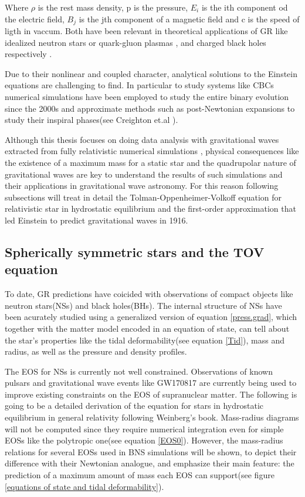 Where $\rho$ is the rest mass density, p is the pressure, $E_i$ is the ith component od the electric field, $B_j$ is the jth component of a magnetic field and c is the speed of ligth in vaccum. Both have been relevant in theoretical applications of GR like idealized neutron stars or quark-gluon plasmas \cite{Nagle_2011}, and charged black holes respectively \cite{PhysRevD.13.2713}.

Due to their nonlinear and coupled character, analytical solutions to the Einstein equations are challenging to find. In particular to study systems like CBCs numerical simulations have been employed to study the entire binary evolution since the 2000s \cite{Shibata:1999hn,Shibata:1999wm,Shibata:2019wef} and  approximate methods such as post-Newtonian expansions to study their inspiral phases(see Creighton et.al \cite[chapter X]{Creighton:2011zz}). 

Although this thesis focuses on doing data analysis with gravitational waves extracted from fully relativistic numerical simulations \cite{Bishop:2016lgv}, physical consequences like the existence of a maximum mass for a static star and the quadrupolar nature of gravitational waves are key to understand the results of such simulations and their applications in gravitational wave astronomy. For this reason following subsections will treat in detail the Tolman-Oppenheimer-Volkoff equation for relativistic star in hydrostatic equilibrium and  the first-order approximation that led Einstein to predict gravitational waves in 1916.



\subsection{Spherically symmetric stars and the TOV equation}\label{codeon}

To date, GR predictions have coicided with observations of compact objects like neutron stars(NSs) and black holes(BHs). The internal structure of NSs have been acurately studied using a generalized version of equation \ref{press.grad}, which together with the matter model encoded in an equation of state, can tell about the star's properties like the tidal deformability(see equation \ref{Tid}), mass and radius, as well as the pressure and density profiles. 

The EOS for NSs is currently not well constrained. Observations of known pulsars and gravitational wave events like GW170817 are currently being used to improve existing constraints on the EOS of supranuclear matter. The following is going to be a detailed derivation of the equation for stars in hydrostatic equilibrium in general relativity following Weinberg's book\cite{Weinberg:1972kfs}. Mass-radius diagrams will not be computed since they require numerical integration even for simple EOSs like the polytropic one(see equation \ref{EOS0}). However, the mass-radius relations for several EOSs used in BNS simulations will be shown, to depict their difference with their Newtonian analogue, and emphasize their main feature: the prediction of a maximum amount of mass each EOS can support(see figure \ref{equations of state and tidal deformability}).

